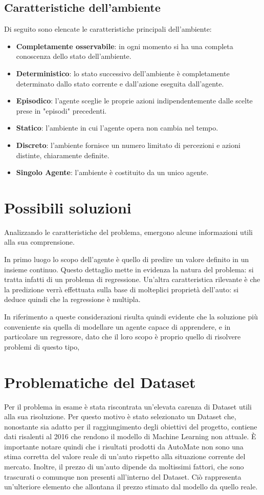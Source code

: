 \subsection{Caratteristiche dell'ambiente}
Di seguito sono elencate le caratteristiche principali dell'ambiente:
\begin{itemize}
    \item \textbf{Completamente osservabile}: in ogni momento si ha una completa conoscenza dello stato dell'ambiente.
    \item \textbf{Deterministico}: lo stato successivo dell’ambiente è completamente determinato dallo stato corrente e dall’azione eseguita dall’agente.
    \item \textbf{Episodico}: l'agente sceglie le proprie azioni indipendentemente dalle scelte prese in "episodi" precedenti.
    \item \textbf{Statico}: l'ambiente in cui l'agente opera non cambia nel tempo.
    \item \textbf{Discreto}: l'ambiente fornisce un numero limitato di percezioni e azioni distinte, chiaramente definite.
    \item \textbf{Singolo Agente}: l'ambiente è costituito da un unico agente.
\end{itemize}

\medskip
\section{Possibili soluzioni}
Analizzando le caratteristiche del problema, emergono alcune informazioni utili alla sua comprensione.

In primo luogo lo scopo dell'agente è quello di predire un valore definito in un insieme continuo. Questo dettaglio mette in evidenza la natura del problema: si tratta infatti di un problema di regressione.
Un'altra caratteristica rilevante è che la predizione verrà effettuata sulla base di molteplici proprietà dell'auto: si deduce quindi che la regressione è multipla.

In riferimento a queste considerazioni risulta quindi evidente che la soluzione più conveniente sia quella di modellare un agente capace di apprendere, e in particolare un regressore, dato che il loro scopo è proprio quello di risolvere problemi di questo tipo,

\medskip
\label{sec:problematicheDataset}
\section{Problematiche del Dataset}
Per il problema in esame è stata riscontrata un'elevata carenza di Dataset utili alla sua risoluzione. Per questo motivo è stato selezionato un Dataset che, nonostante sia adatto per il raggiungimento degli obiettivi del progetto, contiene dati risalenti al 2016 che rendono il modello di Machine Learning non attuale. È importante notare quindi che i risultati prodotti da AutoMate non sono una stima corretta del valore reale di un'auto rispetto alla situazione corrente del mercato.
Inoltre, il prezzo di un'auto dipende da moltissimi fattori, che sono trascurati o comunque non presenti all'interno del Dataset. Ciò rappresenta un'ulteriore elemento che allontana il prezzo stimato dal modello da quello reale.